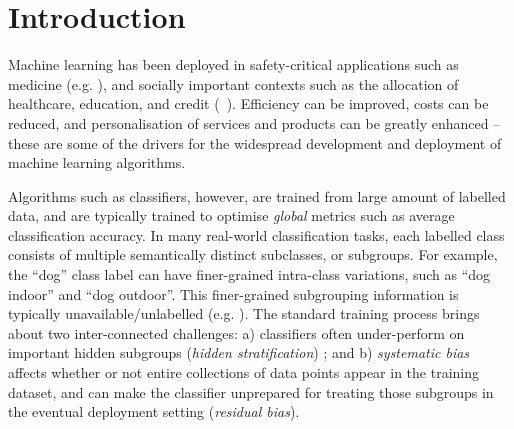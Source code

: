 \section{Introduction}%
\label{sec:introduction}
Machine learning has been deployed in safety-critical applications such as medicine (e.g. \citep{DunYiLanReetal19}), and socially important contexts such as the allocation of healthcare, education, and credit (\eg\ \citep{HurAde17,RagBarKleLev20}). 
%
Efficiency can be improved, costs can be reduced, and personalisation of services and products can be greatly enhanced -- these are some of the drivers for the widespread development and deployment of machine learning algorithms. 
%

Algorithms such as classifiers, however, are trained from large amount of labelled data, and are typically trained to optimise \emph{global} metrics such as average classification accuracy.
%
In many real-world classification tasks, each labelled class consists of multiple semantically distinct subclasses, or subgroups.
For example, the ``dog'' class label can have finer-grained intra-class variations, such as ``dog indoor'' and ``dog outdoor''.
%
This finer-grained subgrouping information is typically unavailable/unlabelled (e.g. \citep{SohDunAngGuetal20,nam2020learning}).
%
The standard training process brings about two inter-connected challenges: a) classifiers often under-perform on important hidden subgroups (\emph{hidden stratification}) \citep{RayDunCarRe20,SohDunAngGuetal20};
and b) \emph{systematic bias}~\citep{kallus2018residual} affects whether or not entire collections of data points appear in the training dataset,
and can make the classifier unprepared for treating those subgroups in the eventual deployment setting
(\emph{residual bias}). %

